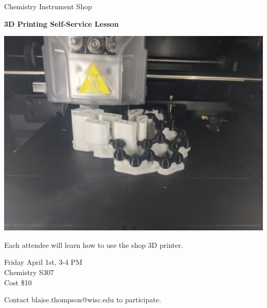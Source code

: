 \documentclass{article}
\begin{document}
\center

\Huge

Chemistry Instrument Shop

\textbf{
3D Printing
Self-Service Lesson
}

\includegraphics[width=\linewidth]{coverart.jpg}

{
\huge
Each attendee will learn how to use the shop 3D printer.
}

\vfill

{
\huge
Friday April 1st, 3-4 PM \\
Chemistry S307 \\
Cost \$10 \\
}

\vfill

{
\huge
Contact blaise.thompson@wisc.edu to participate.
}
\end{document}
